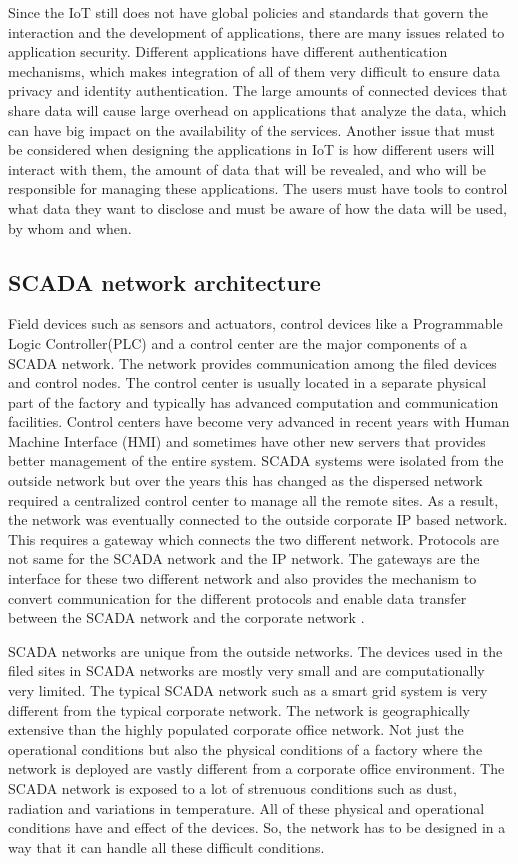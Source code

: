 \documentclass[letterpaper, 10 pt, conference]{ieeeconf}  %
\begin{document}
\begin{itemize}
Since the IoT still does not have global policies and standards that govern the interaction and the development of applications, there are many issues related to application security. Different applications have different authentication mechanisms, which makes integration of all of them very difficult to ensure data privacy and identity authentication. The large amounts of connected devices that share data will cause large overhead on applications that analyze the data, which can have big impact on the availability of the services. 
Another issue that must be considered when designing the applications in IoT is how different users will interact with them, the amount of data that will be revealed, and who will be responsible for managing these applications. The users must have tools to control what data they want to disclose and must be aware of how the data will be used, by whom and when.
\subsection{SCADA network architecture}
Field devices such as sensors and actuators, control devices like a Programmable Logic Controller(PLC) and a control center are the major components of a SCADA network. The network provides communication among the filed devices and control nodes. The control center is usually located in a separate physical part of the factory and typically has advanced computation and communication facilities. Control centers have become very advanced in recent years with Human Machine Interface (HMI) and sometimes have other new servers that provides better management of the entire system. SCADA systems were isolated from the outside network but over the years this has changed as the dispersed network required a centralized control center to manage all the remote sites. As a result, the network was eventually connected to the outside corporate IP based network. This requires a gateway which connects the two different network. Protocols are not same for the SCADA network and the IP network. The gateways are the interface for these two different network and also provides the mechanism to convert communication for the different protocols and enable data transfer between the SCADA network and the corporate network  \cite{c9}.

SCADA networks are unique from the outside networks. The devices used in the filed sites in SCADA networks are mostly very small and are computationally very limited. The typical SCADA network such as a smart grid system is very different from the typical corporate network. The network is geographically extensive than the highly populated corporate office network. Not just the operational conditions but also the physical conditions of a factory where the network is deployed are vastly different from a corporate office environment. The SCADA network is exposed to a lot of strenuous conditions such as dust, radiation and variations in temperature. All of these physical and operational conditions have and effect of the devices. So, the network has to be designed in a way that it can handle all these difficult conditions.


\end{itemize}
\end{document}
